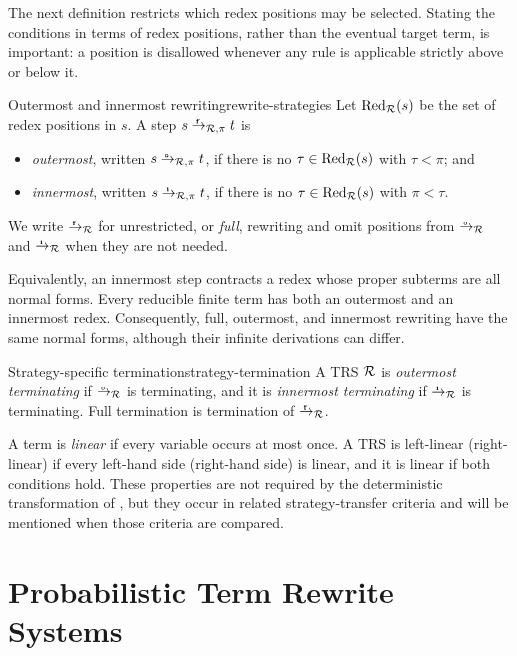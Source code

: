 The next definition restricts which redex positions may be selected.  Stating
the conditions in terms of redex positions, rather than the eventual target
term, is important: a position is disallowed whenever any rule is applicable
strictly above or below it.

\begin{Definition}{Outermost and innermost rewriting}{rewrite-strategies}
  Let $\operatorname{Red}_{\mathcal{R}}(s)$ be the set of redex positions in $s$.
  A step $s\fto_{\R,\pi}t$ is
  \begin{itemize}
    \item \emph{outermost}, written $s\oto_{\R,\pi}t$, if there is no
          $\tau\in\operatorname{Red}_{\mathcal{R}}(s)$ with $\tau<\pi$; and
    \item \emph{innermost}, written $s\ito_{\R,\pi}t$, if there is no
          $\tau\in\operatorname{Red}_{\mathcal{R}}(s)$ with $\pi<\tau$.
  \end{itemize}
  We write $\fto_\R$ for unrestricted, or \emph{full}, rewriting and omit
  positions from $\oto_\R$ and $\ito_\R$ when they are not needed.
\end{Definition}

Equivalently, an innermost step contracts a redex whose proper subterms are all
normal forms.  Every reducible finite term has both an outermost and an
innermost redex.  Consequently, full, outermost, and innermost rewriting have
the same normal forms, although their infinite derivations can differ.

\begin{Definition}{Strategy-specific termination}{strategy-termination}
  A TRS $\mathcal{R}$ is \emph{outermost terminating} if $\oto_\R$ is terminating,
  and it is \emph{innermost terminating} if $\ito_\R$ is terminating.
  Full termination is termination of $\fto_\R$.
\end{Definition}

A term is \emph{linear} if every variable occurs at most once.  A TRS is
left-linear (right-linear) if every left-hand side (right-hand side) is linear,
and it is linear if both conditions hold.  These properties are not required by
the deterministic transformation of \cite{thiemann_2009_outermost}, but they
occur in related strategy-transfer criteria and will be mentioned when those
criteria are compared.

\section{Probabilistic Term Rewrite Systems}\label{sec:ptrs}

